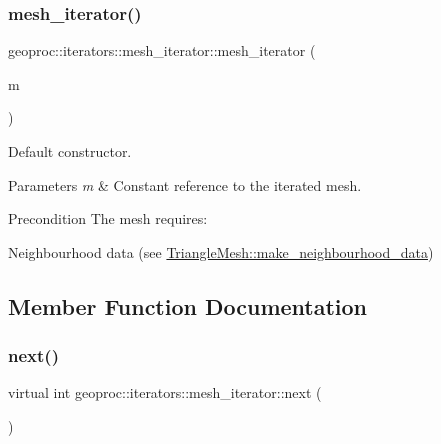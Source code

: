 \subsubsection{\texorpdfstring{mesh\+\_\+iterator()}{mesh\_iterator()}}
{\footnotesize\ttfamily geoproc\+::iterators\+::mesh\+\_\+iterator\+::mesh\+\_\+iterator (\begin{DoxyParamCaption}\item[{const \hyperlink{classgeoproc_1_1TriangleMesh}{Triangle\+Mesh} \&}]{m }\end{DoxyParamCaption})}



Default constructor. 


\begin{DoxyParams}{Parameters}
{\em m} & Constant reference to the iterated mesh. \\
\hline
\end{DoxyParams}
\begin{DoxyPrecond}{Precondition}
The mesh requires\+:
\begin{DoxyItemize}
\item Neighbourhood data (see \hyperlink{classgeoproc_1_1TriangleMesh_a84003dfdfd5e591c00f01a797578ff1f}{Triangle\+Mesh\+::make\+\_\+neighbourhood\+\_\+data}) 
\end{DoxyItemize}
\end{DoxyPrecond}


\subsection{Member Function Documentation}
\mbox{\label{classgeoproc_1_1iterators_1_1mesh__iterator_a32f1ddc2f83743a2b0a4633506601cfe}} 
\subsubsection{\texorpdfstring{next()}{next()}}
{\footnotesize\ttfamily virtual int geoproc\+::iterators\+::mesh\+\_\+iterator\+::next (\begin{DoxyParamCaption}{ }\end{DoxyParamCaption})\hspace{0.3cm}{\ttfamily [pure virtual]}}



